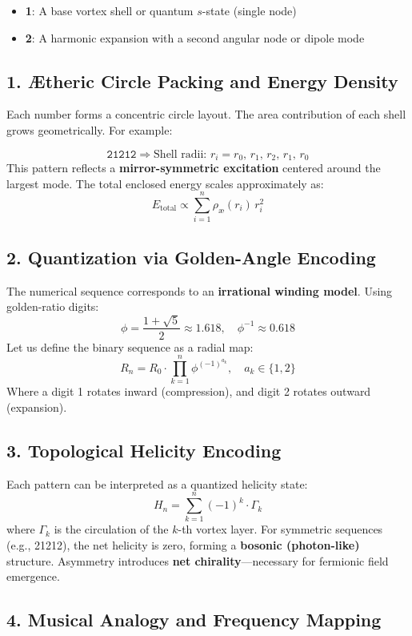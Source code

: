 \documentclass[11pt]{article}
\begin{document}
\begin{itemize}
    \item \textbf{1}: A base vortex shell or quantum \( s \)-state (single node)
    \item \textbf{2}: A harmonic expansion with a second angular node or dipole mode
\end{itemize}

\subsection*{1. Ætheric Circle Packing and Energy Density}

Each number forms a concentric circle layout. The area contribution of each shell grows geometrically. For example:

\[
\texttt{21212} \Rightarrow \text{Shell radii: } r_i = r_0,\, r_1,\, r_2,\, r_1,\, r_0
\]
This pattern reflects a \textbf{mirror-symmetric excitation} centered around the largest mode. The total enclosed energy scales approximately as:
\[
E_{\text{total}} \propto \sum_{i=1}^{n} \rho_\text{\ae}(r_i)\, r_i^2
\]

\subsection*{2. Quantization via Golden-Angle Encoding}

The numerical sequence corresponds to an \textbf{irrational winding model}. Using golden-ratio digits:
\[
\phi = \frac{1 + \sqrt{5}}{2} \approx 1.618,\quad \phi^{-1} \approx 0.618
\]
Let us define the binary sequence as a radial map:
\[
R_n = R_0 \cdot \prod_{k=1}^n \phi^{(-1)^{a_k}}, \quad a_k \in \{1,2\}
\]
Where a digit 1 rotates inward (compression), and digit 2 rotates outward (expansion).

\subsection*{3. Topological Helicity Encoding}

Each pattern can be interpreted as a quantized helicity state:
\[
H_n = \sum_{k=1}^n (-1)^k \cdot \Gamma_k
\]
where \( \Gamma_k \) is the circulation of the \( k \)-th vortex layer. For symmetric sequences (e.g., 21212), the net helicity is zero, forming a \textbf{bosonic (photon-like)} structure. Asymmetry introduces \textbf{net chirality}—necessary for fermionic field emergence.

\subsection*{4. Musical Analogy and Frequency Mapping}
\end{document}
